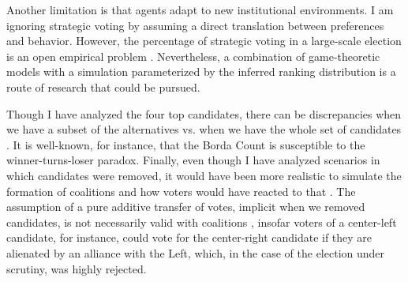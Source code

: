 \documentclass[hidelinks,11pt]{article} \usepackage[utf8]{inputenc}
\begin{document}
Another limitation is that agents adapt to new institutional environments. I am ignoring strategic voting by assuming a direct translation between preferences and behavior. However, the percentage of strategic voting in a large-scale election is an open empirical problem \parencite{straeten10_strat_sincer_heuris_votin_under,kawai2013inferring}. Nevertheless, a combination of game-theoretic models with a simulation parameterized by the inferred ranking distribution is a route of research that could be pursued.

Though I have analyzed the four top candidates, there can be discrepancies when we have a subset of the alternatives vs. when we have the whole set of candidates \parencite{saari2001chaotic, kaminski2015empirical}. It is well-known, for instance, that the Borda Count is susceptible to the winner-turns-loser paradox. Finally, even though I have analyzed scenarios in which candidates were removed, it would have been more realistic to simulate the formation of coalitions and how voters would have reacted to that \parencite{kaminski1998revival}. The assumption of a pure additive transfer of votes, implicit when we removed candidates, is not necessarily valid with coalitions \parencite{kaminski2001coalitional}, insofar voters of a center-left candidate, for instance, could vote for the center-right candidate if they are alienated by an alliance with the Left, which, in the case of the election under scrutiny, was highly rejected. \printbibliography
\end{document}
